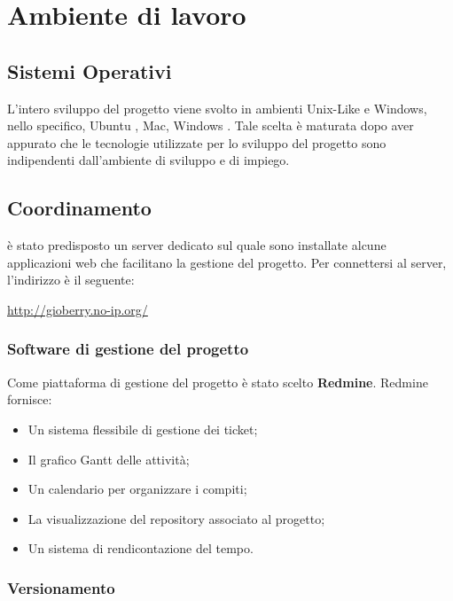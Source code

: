 \section{Ambiente di lavoro} 

\subsection{Sistemi Operativi}

L’intero sviluppo del progetto viene svolto in ambienti Unix-Like e Windows, nello specifico, Ubuntu , Mac, Windows . Tale scelta è maturata dopo aver appurato che le tecnologie utilizzate per lo sviluppo del progetto sono indipendenti dall’ambiente di sviluppo e di impiego.

\subsection{Coordinamento}

è stato predisposto un server dedicato sul quale sono installate alcune applicazioni web
che facilitano la gestione del progetto. Per connettersi al server, l'indirizzo è il seguente:\\
\begin{center}
\url{http://gioberry.no-ip.org/}
\end{center}
\subsubsection{Software di gestione del progetto} 
\label{subsec:Software di gestione del prodotto}
Come piattaforma di gestione del progetto è stato scelto \textbf{Redmine}. Redmine fornisce:
\begin{itemize}
\item Un sistema flessibile di gestione dei ticket;
\item Il grafico Gantt delle attività;
\item Un calendario per organizzare i compiti;
\item La visualizzazione del repository associato al progetto;
\item Un sistema di rendicontazione del tempo.
\end{itemize}


\subsubsection{Versionamento}


